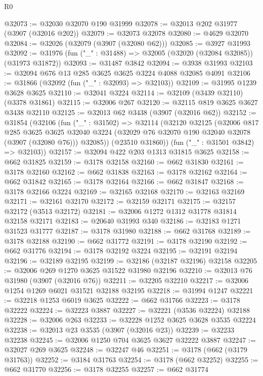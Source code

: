 \begin{lexlean}{R0}
\begin{coremodule}
@32073 := @32030 @32070 @190 @31999
@32078 := @32013 @202 @31977 (@3907 (@32016 @202))
@32079 := @32073 @32078
@32080 := @4629 @32070
@32084 := @32026 (@32079 (@3907 (@32080 @62)))
@32085 := @3927 @31993
@32092 := @31976 (fun ("_" : @31488) => @32005 (@32020 (@32084 @32085)) (@31973 @31872))
@32093 := @31487 @3842
@32094 := @3938 @31993
@32103 := @32094 @676 @13 @285 @3625 @3625 @3224 @4088 @32085 @4091
@32106 := @31866 (@32092 (fun ("_" : @32093) => @32103))
@32109 := @31995 @1239 @3628 @3625
@32110 := @32041 @3224
@32114 := @32109 (@3439 @32110) (@3378 @31861)
@32115 := @32006 @267
@32120 := @32115 @819 @3625 @3627 @3438 @32110
@32125 := @32013 @62 @3438 (@3907 (@32016 @62))
@32152 := @31854
    (@32106
      (fun ("_" : @31502) =>
      @32114
        (@32120
          @32125
          (@32006
            @817
            @285
            @3625
            @3625
            @32040
            @3224
            (@32029 @76 @32070 @190 @32040 @32078 (@3907 (@32080 @76)))
            @32085))
        (@23510 @31860))
      (fun ("_" : @31501 @3842) => @32103))
@32157 := @32094 @422 @203 @1313 @31815 @3625
@32158 := @662 @31825
@32159 := @3178 @32158
@32160 := @662 @31830
@32161 := @3178 @32160
@32162 := @662 @31838
@32163 := @3178 @32162
@32164 := @662 @31842
@32165 := @3178 @32164
@32166 := @662 @31847
@32168 := @3178 @32166 @3224
@32169 := @32165 @32168
@32170 := @32163 @32169
@32171 := @32161 @32170
@32172 := @32159 @32171
@32175 := @32157 @32172 (@3513 @32172)
@32181 := @32006 @1272 @1312 @31778 @31814 @32158 @32171
@32183 := @20640 @31993 @340
@32186 := @32183 @1271 @31523 @31777
@32187 := @3178 @31980
@32188 := @662 @31768
@32189 := @3178 @32188
@32190 := @662 @31772
@32191 := @3178 @32190
@32192 := @662 @31776
@32194 := @3178 @32192 @3224
@32195 := @32191 @32194
@32196 := @32189 @32195
@32199 := @32186 (@32187 @32196) @32158
@32205 := @32006 @269 @1270 @3625 @31522 @31980 @32196
@32210 := @32013 @76 @31980 (@3907 (@32016 @76))
@32211 := @32205 @32210
@32217 := @32006 @1254 @1269 @6021 @31521 @32188 @32195
@32218 := @31994 @1247
@32221 := @32218 @1253 @6019 @3625
@32222 := @662 @31766
@32223 := @3178 @32222
@32224 := @32223 @3887
@32227 := @32221 (@3536 @32224) @32188
@32228 := @32006 @263
@32233 := @32228 @1252 @3625 @3628 @3535 @32224
@32238 := @32013 @23 @3535 (@3907 (@32016 @23))
@32239 := @32233 @32238
@32245 := @32006 @1250 @704 @3625 @3627 @32222 @3887
@32247 := @32027 @269 @3625
@32248 := @32247 @46
@32251 := @3178 (@662 (@3179 @31763))
@32252 := @3184 @31763
@32254 := @3178 (@662 @32252)
@32255 := @662 @31770
@32256 := @3178 @32255
@32257 := @662 @31774

\end{coremodule}
\end{lexlean}
